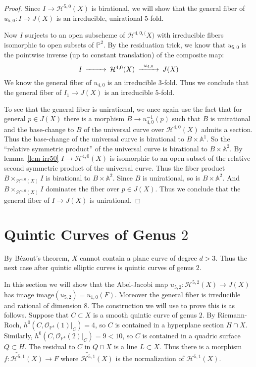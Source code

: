 \documentclass[amssymb,twoside,12 pt,amscd,reqno]{amsart}
\theoremstyle{plain}
\theoremstyle{definition}
\newcommand{\Hdg}[2]{\mathcal{H}^{#1,#2}}
\newcommand{\AAA}{\mathbb{A}}
\newcommand{\PP}{\mathbb{P}}
\def\ps{\vspace{4pt}}
\newcommand{\OO}{\mathcal O}
\begin{document}
\begin{proof}
Since $I\rightarrow \Hdg{5}{0}(X)$ is birational, we will show that the
general fiber of $u_{5,0}:I\rightarrow J(X)$ is an irreducible,
unirational $5$-fold.  

\ps

Now $I$ surjects to an open subscheme of $\Hdg{4,0}(X)$ with
irreducible fibers isomorphic to open subsets of $\PP^2$.  By the
residuation trick, we know that $u_{5,0}$ is the pointwise inverse (up
to constant translation) of the composite map:
\begin{equation}\begin{CD}
I @>>> \Hdg{4}{0}(X) @> u_{4,0} >> J(X)
\end{CD}\end{equation}
We know the general fiber of $u_{4,0}$ is an irreducible $3$-fold.
Thus we conclude that the general fiber of $I_1\rightarrow J(X)$ is an
irreducible $5$-fold.

\ps

To see that the general fiber is unirational, we once again use the
fact that for general $p\in J(X)$ there is a morphism $B\rightarrow
u^{-1}_{4,0}(p)$ such that 
$B$ is unirational and the base-change to $B$ of the universal curve
over $\Hdg{4}{0}(X)$ admits a section.  Thus the base-change of the
universal curve is birational to $B\times \AAA^1$.  So the ``relative
symmetric product'' of the universal curve is birational to
$B\times\AAA^2$.  By lemma~\ref{lem-irr50}
$I\rightarrow \Hdg{4}{0}(X)$ is 
isomorphic to an open subset of the relative second symmetric product
of the universal curve.  Thus the fiber product
$B\times_{\Hdg{4}{0}(X)} I$ is birational to $B\times \AAA^2$.  Since
$B$ is unirational, so is $B\times \AAA^2$.  And
$B\times_{\Hdg{4}{0}(X)} I$ dominates the fiber over $p\in J(X)$.
Thus we conclude that the general fiber of $I\rightarrow J(X)$ is
unirational.  
\end{proof}

\section{Quintic Curves of Genus $2$}

By B\'ezout's theorem, $X$ cannot contain a plane curve of degree
$d>3$.  Thus the next case after quintic elliptic curves is quintic
curves of genus $2$. 

\ps

In this section we will show that the Abel-Jacobi map
$u_{5,2}:\Hdg{5}{2}(X)\rightarrow J(X)$ has image
$\text{image}(u_{5,2}) = u_{1,0}(F)$.  Moreover the general fiber is
irreducible and rational of dimension $8$.  The construction we
will use to prove this is as follows.  Suppose that $C\subset X$ is a
smooth quintic curve of genus $2$.  By Riemann-Roch, 
$h^0(C,\OO_{\PP^4}(1)|_C) = 4$, so $C$ is contained in a hyperplane
section $H\cap X$.  Similarly, $h^0(C,\OO_{\PP^4}(2)|_C)=9<10$, so $C$
is contained in a quadric surface $Q\subset H$.  The residual to $C$
in $Q\cap X$ is a line $L\subset X$.  Thus there is a morphism
$f:\widetilde{\Hdg{5}{1}}(X)\rightarrow F$ where
$\widetilde{\Hdg{5}{1}}(X)$ is the normalization of $\Hdg{5}{1}(X)$.
\end{document}
